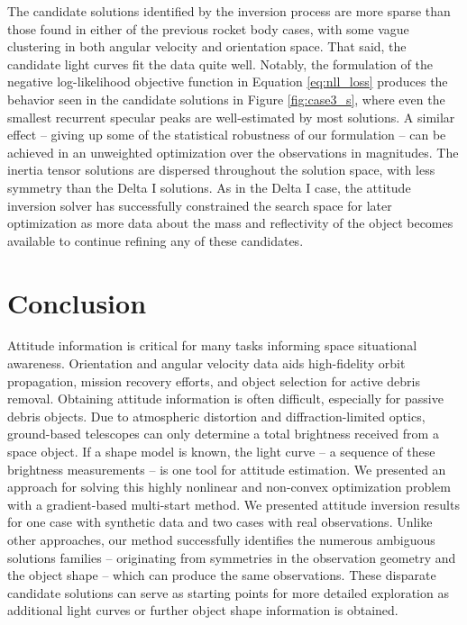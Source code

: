 \documentclass[a4paper,twocolumn]{spaceDebrisC} %
\newcommand{\figmed}[0]{0.4\textwidth}
\begin{document}


The candidate solutions identified by the inversion process are more sparse than those found in either of the previous rocket body cases, with some vague clustering in both angular velocity and orientation space. That said, the candidate light curves fit the data quite well. Notably, the formulation of the negative log-likelihood objective function in Equation \ref{eq:nll_loss} produces the behavior seen in the candidate solutions in Figure \ref{fig:case3_s}, where even the smallest recurrent specular peaks are well-estimated by most solutions. A similar effect -- giving up some of the statistical robustness of our formulation -- can be achieved in an unweighted optimization over the observations in magnitudes. The inertia tensor solutions are dispersed throughout the solution space, with less symmetry than the Delta I solutions. As in the Delta I case, the attitude inversion solver has successfully constrained the search space for later optimization as more data about the mass and reflectivity of the object becomes available to continue refining any of these candidates.

\section{Conclusion}

Attitude information is critical for many tasks informing space situational awareness. Orientation and angular velocity data aids high-fidelity orbit propagation, mission recovery efforts, and object selection for active debris removal. Obtaining attitude information is often difficult, especially for passive debris objects. Due to atmospheric distortion and diffraction-limited optics, ground-based telescopes can only determine a total brightness received from a space object. If a shape model is known, the light curve -- a sequence of these brightness measurements -- is one tool for attitude estimation. We presented an approach for solving this highly nonlinear and non-convex optimization problem with a gradient-based multi-start method. We presented attitude inversion results for one case with synthetic data and two cases with real observations. Unlike other approaches, our method successfully identifies the numerous ambiguous solutions families -- originating from symmetries in the observation geometry and the object shape -- which can produce the same observations. These disparate candidate solutions can serve as starting points for more detailed exploration as additional light curves or further object shape information is obtained.
\end{document}
